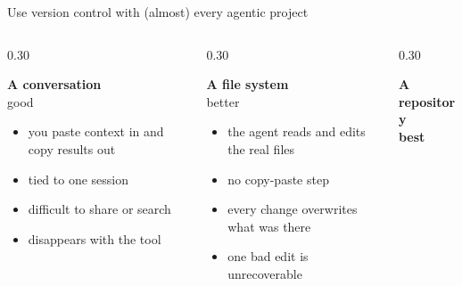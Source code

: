 \begin{frame}{Use version control with (almost) every agentic project}
  \vspace{-0.45cm}
  \begin{columns}[t]
    \begin{column}{0.30\textwidth}
      {\centering\textbf{A conversation}\\[0.15em]
        {\footnotesize\color{Muted}good}\par}
      \vspace{0.5em}
      \begin{itemize}\footnotesize\setlength\itemsep{0.22em}
        \item you paste context in and copy results out
        \item tied to one session
        \item difficult to share or search
        \item disappears with the tool
      \end{itemize}
    \end{column}
    \begin{column}{0.30\textwidth}
      {\centering\textbf{A file system}\\[0.15em]
        {\footnotesize\color{NDGold!80!black}better}\par}
      \vspace{0.5em}
      \begin{itemize}\footnotesize\setlength\itemsep{0.22em}
        \item the agent reads and edits the real files
        \item no copy-paste step
        \item every change overwrites what was there
        \item one bad edit is unrecoverable
      \end{itemize}
    \end{column}
    \begin{column}{0.30\textwidth}
      {\centering\textbf{\color{NDBlue}A repository}\\[0.15em]
        {\footnotesize\color{IrishGreen}\textbf{best}}\par}
      \vspace{0.5em}
      \begin{itemize}\footnotesize\setlength\itemsep{0.22em}

\end{itemize}
\end{column}
\end{columns}
\end{frame}
